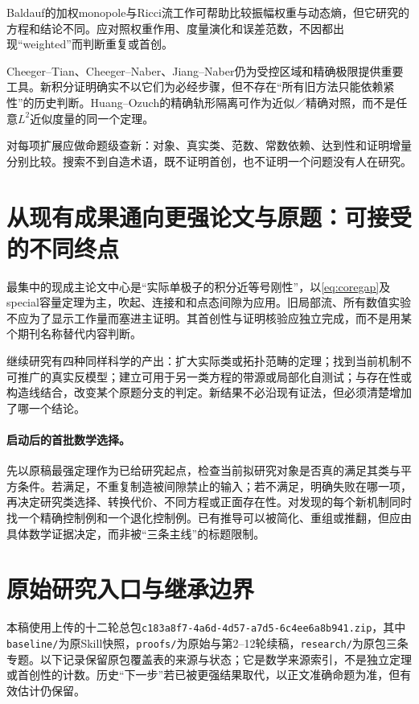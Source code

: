 \documentclass[UTF8,fontset=fandol,zihao=-4]{ctexart}
\theoremstyle{cn}
\begin{document}
Baldauf的加权monopole与Ricci流工作\cite{Baldauf}可帮助比较振幅权重与动态熵，但它研究的方程和结论不同。应对照权重作用、度量演化和误差范数，不因都出现“weighted”而判断重复或首创。

Cheeger--Tian、Cheeger--Naber、Jiang--Naber\cite{CT,CN,JN}仍为受控区域和精确极限提供重要工具。新积分证明确实不以它们为必经步骤，但不存在“所有旧方法只能依赖紧性”的历史判断。Huang--Ozuch的精确轨形隔离\cite{HO}可作为近似／精确对照，而不是任意$L^2$近似度量的同一个定理。

对每项扩展应做命题级查新：对象、真实类、范数、常数依赖、达到性和证明增量分别比较。搜索不到自造术语，既不证明首创，也不证明一个问题没有人在研究。

\section{从现有成果通向更强论文与原题：可接受的不同终点}
最集中的现成主论文中心是“实际单极子的积分近等号刚性”，以\eqref{eq:coregap}及special容量定理为主，吹起、连接和和点态间隙为应用。旧局部流、所有数值实验不应为了显示工作量而塞进主证明。其首创性与证明核验应独立完成，而不是用某个期刊名称替代内容判断。

继续研究有四种同样科学的产出：扩大实际类或拓扑范畴的定理；找到当前机制不可推广的真实反模型；建立可用于另一类方程的带源或局部化自测试；与存在性或构造线结合，改变某个原题分支的判定。新结果不必沿现有证法，但必须清楚增加了哪一个结论。

\paragraph{启动后的首批数学选择。}
先以原稿最强定理作为已给研究起点，检查当前拟研究对象是否真的满足其类与平方条件。若满足，不重复制造被间隙禁止的输入；若不满足，明确失败在哪一项，再决定研究类选择、转换代价、不同方程或正面存在性。对发现的每个新机制同时找一个精确控制例和一个退化控制例。已有推导可以被简化、重组或推翻，但应由具体数学证据决定，而非被“三条主线”的标题限制。
\appendix
\section{原始研究入口与继承边界}
本稿使用上传的十二轮总包\nolinkurl{c183a8f7-4a6d-4d57-a7d5-6c4ee6a8b941.zip}，其中\nolinkurl{baseline/}为原Skill快照，\nolinkurl{proofs/}为原始与第2--12轮续稿，\nolinkurl{research/}为原包三条专题。以下记录保留原包覆盖表的来源与状态；它是数学来源索引，不是独立定理或首创性的计数。历史“下一步”若已被更强结果取代，以正文准确命题为准，但有效估计仍保留。
\end{document}
